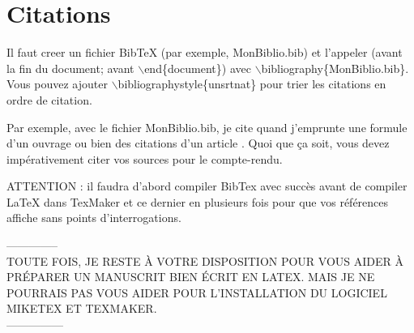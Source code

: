 \documentclass[a4paper,10pt]{report} %
\begin{document}
\section{Citations}
\label{sec:Biblio}
Il faut creer un fichier BibTeX (par exemple, MonBiblio.bib) et l'appeler (avant la fin du document; avant $\backslash$end\{document\}) avec $\backslash$bibliography\{MonBiblio.bib\}. Vous pouvez ajouter
$\backslash$bibliographystyle\{unsrtnat\} pour trier les citations en ordre de citation.

Par exemple, avec le fichier MonBiblio.bib, je cite quand j'emprunte une formule d'un ouvrage \cite{Auteur1_Livre} ou bien des citations d'un article \cite{Auteur_ArticleSci}. Quoi que ça soit, vous devez impérativement citer vos sources pour le compte-rendu.

ATTENTION : il faudra d'abord compiler BibTex avec succès avant de compiler LaTeX dans TexMaker et ce dernier en plusieurs fois pour que vos références affiche sans points d'interrogations.

\begin{center}
--------------\\
TOUTE FOIS, JE RESTE À VOTRE DISPOSITION POUR VOUS AIDER À PRÉPARER UN MANUSCRIT BIEN ÉCRIT EN LATEX. MAIS JE NE POURRAIS PAS VOUS AIDER POUR L'INSTALLATION DU LOGICIEL MIKETEX ET TEXMAKER.\\
---------------
\end{center}


	
\end{document}
